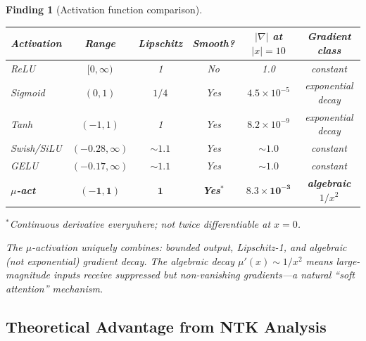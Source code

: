\documentclass[11pt]{article}
\newtheorem{finding}[theorem]{Finding}
\theoremstyle{definition}
\theoremstyle{remark}
\newcommand{\ee}[1]{\times 10^{#1}}
\begin{document}
\begin{finding}[Activation function comparison]
\label{find:activation-compare}
\begin{center}
\begin{tabular}{@{}lccccc@{}}
\toprule
\textbf{Activation} & \textbf{Range} & \textbf{Lipschitz} &
\textbf{Smooth?} & $|\nabla|$ at $|x|=10$ & \textbf{Gradient class} \\
\midrule
ReLU & $[0,\infty)$ & 1 & No & 1.0 & constant \\
Sigmoid & $(0,1)$ & $1/4$ & Yes & $4.5\ee{-5}$ & exponential decay \\
Tanh & $(-1,1)$ & 1 & Yes & $8.2\ee{-9}$ & exponential decay \\
Swish/SiLU & $(-0.28,\infty)$ & $\sim 1.1$ & Yes & $\sim 1.0$ & constant \\
GELU & $(-0.17,\infty)$ & $\sim 1.1$ & Yes & $\sim 1.0$ & constant \\
\textbf{$\mu$-act} & $\mathbf{(-1,1)}$ & $\mathbf{1}$ & \textbf{Yes}$^*$
  & $\mathbf{8.3\ee{-3}}$ & \textbf{algebraic $1/x^2$} \\
\bottomrule
\end{tabular}
\end{center}
$^*$Continuous derivative everywhere; not twice differentiable at $x=0$.

The $\mu$-activation uniquely combines: bounded output, Lipschitz-1,
and algebraic (not exponential) gradient decay. The algebraic decay
$\mu'(x) \sim 1/x^2$ means large-magnitude inputs receive suppressed
but non-vanishing gradients---a natural ``soft attention'' mechanism.
\end{finding}

\subsection{Theoretical Advantage from NTK Analysis}
\end{document}
